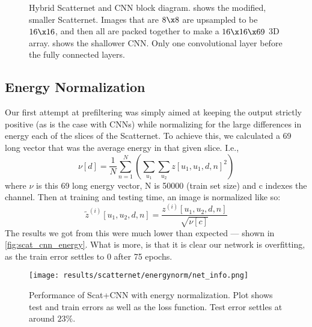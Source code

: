   \begin{figure}
    \centering
      \newline
      \caption[Hybrid Scatternet and CNN block diagram]
              {Hybrid Scatternet and CNN block diagram.
               shows the modified, smaller
              Scatternet. Images that are $8\x8$ are upsampled to be $16\x 16$,
              and then all are packed together to make a $16\x 16\x 69$ 3D
              array.  shows the shallower CNN\@. Only one
              convolutional layer before the fully connected layers.}
      \label{fig:hybrid}
  \end{figure}

\subsection{Energy Normalization}
  Our first attempt at prefiltering was simply aimed at keeping the output
  strictly positive (as is the case with CNNs) while normalizing for the large
  differences in energy each of the slices of the Scatternet. To
  achieve this, we calculated a 69 long vector that was the average energy in
  that given slice. I.e.,\
  \begin{equation}
    \nu [d] = \frac{1}{N} \sum_{n=1}^{N} \left(\sum_{u_1} \sum_{u_2}
      {z[u_1,u_1,d,n]}^2 \right)
  \end{equation}
  where $\nu$ is this 69 long energy vector, N is 50000 (train set size) and
  c indexes the channel. Then
  at training and testing time, an image is normalized like so:
  \begin{equation}
    \tilde{z}^{(i)}[u_1,u_2,d,n] = \frac{z^{(i)} [u_1,u_2,d,n]}{\sqrt{\nu [c]}}
  \end{equation}
  The results we got from this were much lower than expected --- shown in
  \autoref{fig:scat_cnn_energy}. What is more, is that it is clear our network
  is overfitting, as the train error settles to 0 after 75 epochs.

  \begin{figure}
    \centering
      \texttt{[image: results/scatternet/energynorm/net\_info.png]}
      \caption[Performance of Scat+CNN with energy normalization]
              {Performance of Scat+CNN with energy normalization. Plot shows
              test and train errors as well as the loss function. Test error
              settles at around $23\%$.}
      \label{fig:scat_cnn_energy}
  \end{figure}

